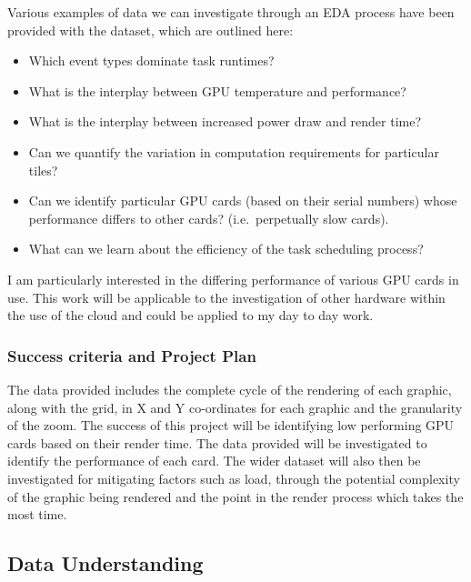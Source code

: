 \documentclass[
  twocolumn]{article}
\providecommand{\tightlist}{%
  \setlength{\itemsep}{0pt}\setlength{\parskip}{0pt}}
\begin{document}
Various examples of data we can investigate through an EDA process have
been provided with the dataset, which are outlined here:

\begin{itemize}
\tightlist
\item
  Which event types dominate task runtimes?
\item
  What is the interplay between GPU temperature and performance?
\item
  What is the interplay between increased power draw and render time?
\item
  Can we quantify the variation in computation requirements for
  particular tiles?
\item
  Can we identify particular GPU cards (based on their serial numbers)
  whose performance differs to other cards? (i.e.~perpetually slow
  cards).
\item
  What can we learn about the efficiency of the task scheduling process?
\end{itemize}

I am particularly interested in the differing performance of various GPU
cards in use. This work will be applicable to the investigation of other
hardware within the use of the cloud and could be applied to my day to
day work.

\hypertarget{success-criteria-and-project-plan}{%
\subsubsection{Success criteria and Project
Plan}\label{success-criteria-and-project-plan}}

The data provided includes the complete cycle of the rendering of each
graphic, along with the grid, in X and Y co-ordinates for each graphic
and the granularity of the zoom. The success of this project will be
identifying low performing GPU cards based on their render time. The
data provided will be investigated to identify the performance of each
card. The wider dataset will also then be investigated for mitigating
factors such as load, through the potential complexity of the graphic
being rendered and the point in the render process which takes the most
time.

\hypertarget{data-understanding}{%
\subsection{Data Understanding}\label{data-understanding}}
\end{document}

